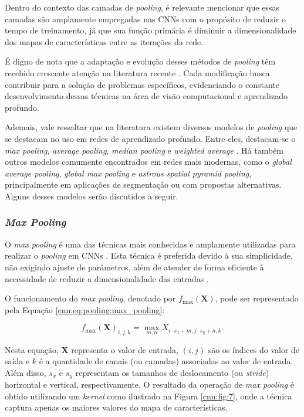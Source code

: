 Dentro do contexto das camadas de \textit{pooling}, é relevante mencionar que essas camadas são amplamente empregadas nas CNNs com o propósito de reduzir o tempo de treinamento, já que sua função primária é diminuir a dimensionalidade dos mapas de características entre as iterações da rede.

É digno de nota que a adaptação e evolução desses métodos de \textit{pooling} têm recebido crescente atenção na literatura recente \citep{Sabri2020AClassificationb, Zafar2022ANetworks}. Cada modificação busca contribuir para a solução de problemas específicos, evidenciando o constante desenvolvimento dessas técnicas na área de visão computacional e aprendizado profundo.

Ademais, vale ressaltar que na literatura existem diversos modelos de \textit{pooling} que se destacam no uso em redes de aprendizado profundo. Entre eles, destacam-se o \textit{max pooling}, \textit{average pooling}, \textit{median pooling} e \textit{weighted average} \citep{Goodfellow2016}. Há também outros modelos comumente encontrados em redes mais modernas, como o \textit{global average pooling}, \textit{global max pooling} e \textit{astrous spatial pyramid pooling}, principalmente em aplicações de segmentação ou com propostas alternativas. Alguns desses modelos serão discutidos a seguir.

\subsubsection{\textit{Max Pooling}}
\label{cnn:pooling:max_pooling}
O \textit{max pooling} é uma das técnicas mais conhecidas e amplamente utilizadas para realizar o \textit{pooling} em CNNs \citep{Zafar2022ANetworks, Paul2019DimensionalityPooling}. Esta técnica é preferida devido à sua simplicidade, não exigindo ajuste de parâmetros, além de atender de forma eficiente à necessidade de reduzir a dimensionalidade das entradas \citep{Boureau2010ARecognition}.

O funcionamento do \textit{max pooling}, denotado por $f_{\max}(\boldsymbol{X})$, pode ser representado pela Equação \ref{cnn:eq:pooling:max_pooling}:

\begin{equation}
\label{cnn:eq:pooling:max_pooling}
f_{\max}(\boldsymbol{X})_{i, j, k} = \max_{m, n} X_{i \cdot s_x + m, j \cdot s_{y} + n, k}.
\end{equation}

Nesta equação, $\boldsymbol{X}$ representa o valor de entrada, $(i, j)$ são os índices do valor de saída e $k$ é a quantidade de canais (ou camadas) associadas ao valor de entrada. Além disso, $s_{x}$ e $s_{y}$ representam os tamanhos de deslocamento (ou \textit{stride}) horizontal e vertical, respectivamente. O resultado da operação de \textit{max pooling} é obtido utilizando um \textit{kernel} como ilustrado na Figura \ref{cnn:fig:7}, onde a técnica captura apenas os maiores valores do mapa de características.

